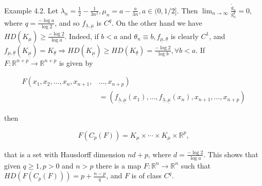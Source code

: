 \documentclass[10pt]{article}
\begin{document}
Example 4.2. Let $\lambda_{n}=\frac{1}{2}-\frac{1}{3 n^{2}}, \mu_{n}=a-\frac{a}{3 n}, a \in(0,1 / 2]$. Then $\lim _{n \rightarrow \infty} \frac{\tilde{g}_{n}}{g_{n}^{q}}=0$, where $q=\frac{-\log a}{\log 2}$, and so $f_{\underline{\lambda}, \underline{\mu}}$ is $C^{q}$. On the other hand we have $H D\left(K_{\underline{\mu}}\right) \geq \frac{-\log 2}{\log a}$. Indeed, if $b<a$ and $\theta_{n} \equiv b, f_{\underline{\mu}, \underline{\theta}}$ is clearly $C^{1}$, and $f_{\underline{\mu}, \underline{\theta}}\left(K_{\underline{\mu}}\right)=K_{\underline{\theta}} \Rightarrow H D\left(K_{\underline{\mu}}\right) \geq H D\left(K_{\underline{\theta}}\right)=\frac{-\log 2}{\log b}, \forall b<a$. If\\
$F: \mathbb{R}^{n+p} \rightarrow \mathbb{R}^{n+p}$ is given by

$$
\begin{aligned}
F\left(x_{1}, x_{2}, \ldots, x_{n}, x_{n+1},\right. & \left.\ldots, x_{n+p}\right) \\
& =\left(f_{\underline{\lambda}, \underline{\mu}}\left(x_{1}\right), \ldots, f_{\underline{\lambda}, \underline{\mu}}\left(x_{n}\right), x_{n+1}, \ldots, x_{n+p}\right)
\end{aligned}
$$

then

$$
F\left(C_{p}(F)\right)=K_{\underline{\mu}} \times \cdots \times K_{\underline{\mu}} \times \mathbb{R}^{p},
$$

that is a set with Hausdorff dimension $n d+p$, where $d=\frac{-\log 2}{\log a}$. This shows that given $q \geq 1, p>0$ and $n>p$ there is a map $F: \mathbb{R}^{n} \rightarrow \mathbb{R}^{n}$ such that $H D\left(F\left(C_{p}(F)\right)\right)=p+\frac{n-p}{q}$, and $F$ is of class $C^{q}$.
\end{document}
